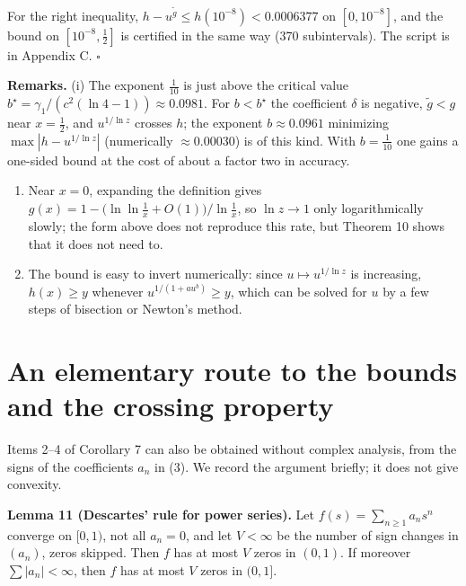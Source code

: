 \documentclass[
  11pt,
]{article}
\begin{document}
For the right inequality,
\(h - u^{\tilde g} \le h(10^{-8}) < 0.0006377\) on \([0, 10^{-8}]\), and
the bound on \([10^{-8}, \tfrac12]\) is certified in the same way (370
subintervals). The script is in Appendix C. \(\square\)

\textbf{Remarks.} (i) The exponent \(\tfrac1{10}\) is just above the
critical value \(b^\star = \gamma_1/(c^2(\ln 4 - 1)) \approx 0.0981\).
For \(b < b^\star\) the coefficient \(\delta\) is negative,
\(\tilde g < g\) near \(x = \tfrac12\), and \(u^{1/\ln z}\) crosses
\(h\); the exponent \(b \approx 0.0961\) minimizing
\(\max|h - u^{1/\ln z}|\) (numerically \(\approx 0.00030\)) is of this
kind. With \(b = \tfrac1{10}\) one gains a one-sided bound at the cost
of about a factor two in accuracy.

\begin{enumerate}
\def\labelenumi{(\roman{enumi})}
\setcounter{enumi}{1}
\item
  Near \(x = 0\), expanding the definition gives
  \(g(x) = 1 - \bigl(\ln\ln\frac1x + O(1)\bigr)/\ln\frac1x\), so
  \(\ln z \to 1\) only logarithmically slowly; the form above does not
  reproduce this rate, but Theorem 10 shows that it does not need to.
\item
  The bound is easy to invert numerically: since
  \(u \mapsto u^{1/\ln z}\) is increasing, \(h(x) \ge y\) whenever
  \(u^{1/(1+a u^{b})} \ge y\), which can be solved for \(u\) by a few
  steps of bisection or Newton's method.
\end{enumerate}

\hypertarget{an-elementary-route-to-the-bounds-and-the-crossing-property}{%
\section{An elementary route to the bounds and the crossing
property}\label{an-elementary-route-to-the-bounds-and-the-crossing-property}}

Items 2--4 of Corollary 7 can also be obtained without complex analysis,
from the signs of the coefficients \(a_n\) in (3). We record the
argument briefly; it does not give convexity.

\textbf{Lemma 11 (Descartes' rule for power series).} Let
\(f(s) = \sum_{n\ge1} a_n s^n\) converge on \([0,1)\), not all
\(a_n = 0\), and let \(V < \infty\) be the number of sign changes in
\((a_n)\), zeros skipped. Then \(f\) has at most \(V\) zeros in
\((0,1)\). If moreover \(\sum|a_n| < \infty\), then \(f\) has at most
\(V\) zeros in \((0,1]\).
\end{document}
